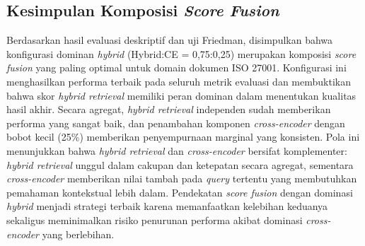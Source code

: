 \subsection{Kesimpulan Komposisi \textit{Score Fusion}}

Berdasarkan hasil evaluasi deskriptif dan uji Friedman, disimpulkan bahwa konfigurasi dominan \textit{hybrid} (Hybrid:CE = 0{,}75:0{,}25) merupakan komposisi \textit{score fusion} yang paling optimal untuk domain dokumen ISO 27001. Konfigurasi ini menghasilkan performa terbaik pada seluruh metrik evaluasi dan membuktikan bahwa skor \textit{hybrid retrieval} memiliki peran dominan dalam menentukan kualitas hasil akhir. Secara agregat, \textit{hybrid retrieval} independen sudah memberikan performa yang sangat baik, dan penambahan komponen \textit{cross-encoder} dengan bobot kecil (25\%) memberikan penyempurnaan marginal yang konsisten. Pola ini menunjukkan bahwa \textit{hybrid retrieval} dan \textit{cross-encoder} bersifat komplementer: \textit{hybrid retrieval} unggul dalam cakupan dan ketepatan secara agregat, sementara \textit{cross-encoder} memberikan nilai tambah pada \textit{query} tertentu yang membutuhkan pemahaman kontekstual lebih dalam. Pendekatan \textit{score fusion} dengan dominasi \textit{hybrid} menjadi strategi terbaik karena memanfaatkan kelebihan keduanya sekaligus meminimalkan risiko penurunan performa akibat dominasi \textit{cross-encoder} yang berlebihan.
